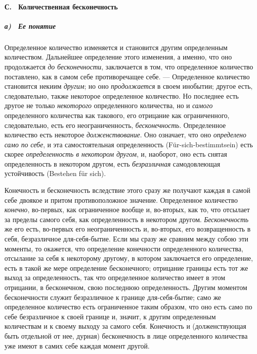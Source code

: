 {\paragraph[С. \ Количественная бесконечность]{С. \ Количественная
бесконечность}
\subparagraph[а) \ Ее понятие]{а) \ Ее понятие}
Определенное количество изменяется и становится другим определенным
количеством. Дальнейшее определение этого изменения, а именно, что оно
продолжается {\em до бесконечности}, заключается в том,
что определенное количество поставлено, как в самом себе противоречащее
себе. — Определенное количество становится некиим
{\em другим}; но оно
{\em продолжается} в своем инобытии; другое есть,
следовательно, также некоторое определенное количество. Но последнее есть
другое не только {\em некоторого} определенного
количества, но и {\em самого} определенного количества
как такового, его отрицание как ограниченного, следовательно, есть его
неограниченность, {\em бесконечность}. Определенное
количество есть некоторое {\em долженствование}. Оно
означает, что оно {\em определено само по себе}, и эта
самостоятельная определенность (Für-sich-bestimmtsein) есть скорее
{\em определенность в некотором другом}, и, наоборот,
оно есть снятая определенность в некотором другом, есть
{\em безразличная} самодовлеющая устойчивость (Bestehen
für sich).

Конечность и бесконечность вследствие этого сразу же получают каждая в самой
себе двоякое и притом противоположное значение. Определенное количество
{\em конечно}, во-первых, как ограниченное вообще и,
во-вторых, как то, что отсылает за пределы самого себя, как определенность
в некотором другом. {\em Бесконечность} же его есть,
во-первых его неограниченность и, во-вторых, его возвращенность в себя,
безразличное для-себя-бытие. Если мы сразу же сравним между собою эти
моменты, то окажется, что определение конечности определенного количества,
отсылание за себя к некоторому другому, в котором заключается его
определение, есть в такой же мере определение бесконечного; отрицание
границы есть тот же выход за определенность, так что определенное
количество имеет в этом отрицании, в бесконечном, свою последнюю
определенность. Другим моментом бесконечности служит безразличное к границе
для-себя-бытие; само же определенное количество есть ограниченное таким
образом, что оно есть само по себе безразличное к своей границе и, значит,
к другим определенным количествам и к своему выходу за самого себя.
Конечность и (долженствующая быть отдельной от нее, дурная) бесконечность в
лице определенного количества уже имеют в самих себе каждая момент другой.

}
